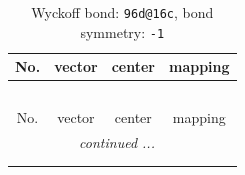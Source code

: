 \documentclass[fleqn,8pt]{jsarticle}
\begin{document}
\renewcommand{\arraystretch}{1.2}
\begin{longtable}{cccc}
\caption{Wyckoff bond: {\tt 96d@16c}, bond symmetry: {\tt -1}}
 \\
 \hline \hline
No. & vector & center & mapping \\ \hline \endfirsthead

\multicolumn{3}{l}{\tablename\ \thetable{}} \\
 \hline \hline
No. & vector & center & mapping \\ \hline \endhead

 \hline \hline
\multicolumn{3}{r}{\footnotesize\it continued ...} \\ \endfoot

 \hline \hline
\multicolumn{3}{r}{} \\ \endlastfoot


\end{longtable}
\end{document}
